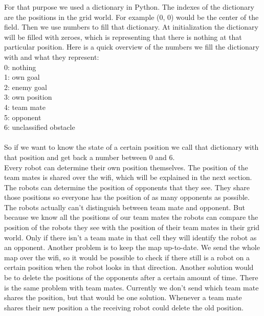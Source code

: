 \documentclass[lnicst,a4paper]{svmultln}
\begin{document}
For that purpose we used a dictionary in Python. The indexes of the dictionary are the positions in the grid world. For example (0, 0) would be the center of the field. Then we use numbers to fill that dictionary. At initialization the dictionary will be filled with zeroes, which is representing that there is nothing at that particular position. Here is a quick overview of the numbers we fill the dictionary with and what they represent:\\
0: nothing\\
1: own goal\\
2: enemy goal\\
3: own position\\
4: team mate\\
5: opponent\\
6: unclassified obstacle\\
\\
So if we want to know the state of a certain position we call that dictionary with that position and get back a number between 0 and 6.
\\
Every robot can determine their own position themselves. The position of the team mates is shared over the wifi, which will be explained in the next section. The robots can determine the position of opponents that they see. They share those positions so everyone has the position of as many opponents as possible. The robots actually can't distinguish between team mate and opponent. But because we know all the positions of our team mates the robots can compare the position of the robots they see with the position of their team mates in their grid world. Only if there isn't a team mate in that cell they will identify the robot as an opponent. Another problem is to keep the map up-to-date. We send the whole map over the wifi, so it would be possible to check if there still is a robot on a certain position when the robot looks in that direction. Another solution would be to delete the positions of the opponents after a certain amount of time. There is the same problem with team mates. Currently we don't send which team mate shares the position, but that would be one solution. Whenever a team mate shares their new position a the receiving robot could delete the old position.
\\



\end{document}
